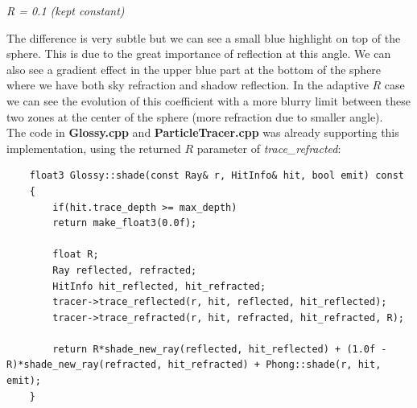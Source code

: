 \documentclass[a4,12pt]{article}
\begin{document}
\begin{center}
\begin{minipage}[b]{0.40\linewidth}
\begin{center}
				\textit{R = 0.1 (kept constant)}
			\end{center}
		\end{minipage}
	\end{center}
	
	The difference is very subtle but we can see a small blue highlight on top of the sphere. This is due to the great importance of reflection at this angle. We can also see a gradient effect in the upper blue part at the bottom of the sphere where we have both sky refraction and shadow reflection. In the adaptive $R$ case we can see the evolution of this coefficient with a more blurry limit between these two zones at the center of the sphere (more refraction due to smaller angle).\\
	
	
	
	The code in	\textbf{Glossy.cpp} and \textbf{ParticleTracer.cpp} was already supporting this implementation, using the returned $R$ parameter of \textit{trace\_refracted}:
	\begin{lstlisting}
	float3 Glossy::shade(const Ray& r, HitInfo& hit, bool emit) const
	{
		if(hit.trace_depth >= max_depth)
		return make_float3(0.0f);
		
		float R;
		Ray reflected, refracted;
		HitInfo hit_reflected, hit_refracted;
		tracer->trace_reflected(r, hit, reflected, hit_reflected);
		tracer->trace_refracted(r, hit, refracted, hit_refracted, R);
		
		return R*shade_new_ray(reflected, hit_reflected) + (1.0f - R)*shade_new_ray(refracted, hit_refracted) + Phong::shade(r, hit, emit);
	}
	\end{lstlisting}
	
\end{document}
